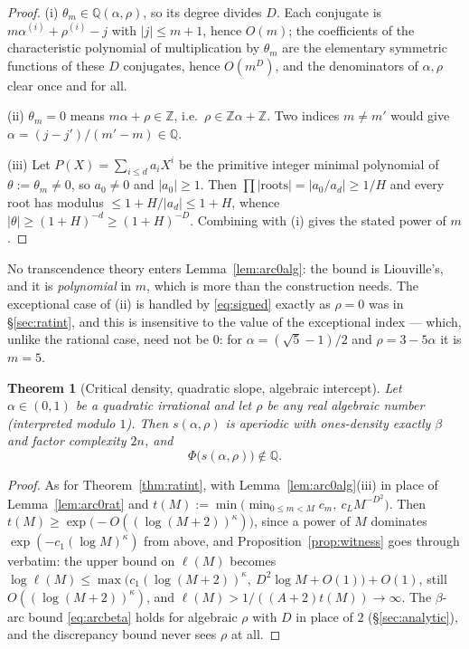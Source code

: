 \documentclass[11pt]{article}
\newtheorem{theorem}{Theorem}[section]
\newcommand{\Q}{\mathbb{Q}}
\newcommand{\Z}{\mathbb{Z}}
\begin{document}
\begin{proof}
(i) $\theta_m\in\Q(\alpha,\rho)$, so its degree divides $D$. Each conjugate is
$m\alpha^{(i)}+\rho^{(i)}-j$ with $|j|\le m+1$, hence $O(m)$; the coefficients of the characteristic
polynomial of multiplication by $\theta_m$ are the elementary symmetric functions of these $D$
conjugates, hence $O(m^D)$, and the denominators of $\alpha,\rho$ clear once and for all.

(ii) $\theta_m=0$ means $m\alpha+\rho\in\Z$, i.e.\ $\rho\in\Z\alpha+\Z$. Two indices $m\ne m'$ would
give $\alpha=(j-j')/(m'-m)\in\Q$.

(iii) Let $P(X)=\sum_{i\le d}a_iX^i$ be the primitive integer minimal polynomial of
$\theta:=\theta_m\ne0$, so $a_0\ne0$ and $|a_0|\ge1$. Then $\prod|\text{roots}|=|a_0/a_d|\ge1/H$ and
every root has modulus $\le1+H/|a_d|\le1+H$, whence $|\theta|\ge(1+H)^{-d}\ge(1+H)^{-D}$. Combining
with (i) gives the stated power of $m$.
\end{proof}

No transcendence theory enters Lemma~\ref{lem:arc0alg}: the bound is Liouville's, and it is
\emph{polynomial} in $m$, which is more than the construction needs. The exceptional case of (ii)
is handled by \eqref{eq:signed} exactly as $\rho=0$ was in \S\ref{sec:ratint}, and this is
insensitive to the value of the exceptional index --- which, unlike the rational case, need not be
$0$: for $\alpha=(\sqrt5-1)/2$ and $\rho=3-5\alpha$ it is $m=5$.

\begin{theorem}[Critical density, quadratic slope, algebraic intercept]
\label{thm:algint}
Let $\alpha\in(0,1)$ be a quadratic irrational and let $\rho$ be any real algebraic number
(interpreted modulo $1$). Then $s(\alpha,\rho)$ is aperiodic with ones-density exactly $\beta$ and
factor complexity $2n$, and
\[
  \Phi\bigl(s(\alpha,\rho)\bigr)\notin\Q .
\]
\end{theorem}

\begin{proof}
As for Theorem~\ref{thm:ratint}, with Lemma~\ref{lem:arc0alg}(iii) in place of
Lemma~\ref{lem:arc0rat} and $t(M):=\min\bigl(\min_{0\le m<M}c_m,\ c_LM^{-D^2}\bigr)$. Then
$t(M)\ge\exp\bigl(-O((\log(M+2))^\kappa)\bigr)$, since a power of $M$ dominates
$\exp(-c_1(\log M)^\kappa)$ from above, and Proposition~\ref{prop:witness} goes through verbatim:
the upper bound on $\ell(M)$ becomes
$\log\ell(M)\le\max\bigl(c_1(\log(M+2))^\kappa,\ D^2\log M+O(1)\bigr)+O(1)$, still
$O((\log(M+2))^\kappa)$, and $\ell(M)>1/((A+2)t(M))\to\infty$. The $\beta$-arc bound
\eqref{eq:arcbeta} holds for algebraic $\rho$ with $D$ in place of $2$
(\S\ref{sec:analytic}), and the discrepancy bound never sees $\rho$ at all.
\end{proof}
\end{document}
